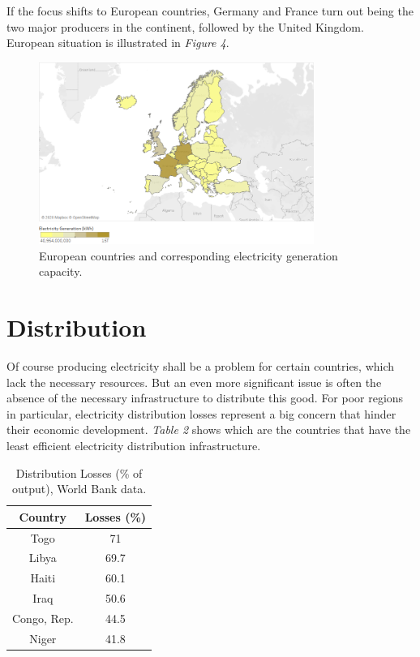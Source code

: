 \documentclass{book}
\begin{document}
If the focus shifts to European countries, Germany and France turn out being the two major producers in the continent, followed by the United Kingdom. European situation is illustrated in \textit{Figure 4}.

\bigskip
\begin{figure}[H]
\begin{center}
\captionsetup{justification=centering}
\includegraphics[width=0.8\textwidth]{Images/prod.png}
\caption{European countries and corresponding electricity generation capacity. }
\end{center}
\end{figure}
\bigskip

\section{Distribution}

Of course producing electricity shall be a problem for certain countries, which lack the necessary resources. But an even more significant issue is often the absence of the necessary infrastructure to distribute this good. For poor regions in particular, electricity distribution losses represent  a big concern that hinder their economic development. \textit{Table 2} shows which are the countries that have the least efficient electricity distribution infrastructure.

\bigskip
\begin{table}[H]
\begin{center}
\begin{tabular}{|c|c|}
\hline
Country & Losses (\%)\\
\hline
Togo & 71\\
Libya & 69.7\\
Haiti & 60.1\\
Iraq & 50.6\\
Congo, Rep. & 44.5\\
Niger & 41.8\\
\hline
\end{tabular}
\caption{Distribution Losses (\% of output), World Bank data.}
\end{center}
\end{table}
\end{document}
